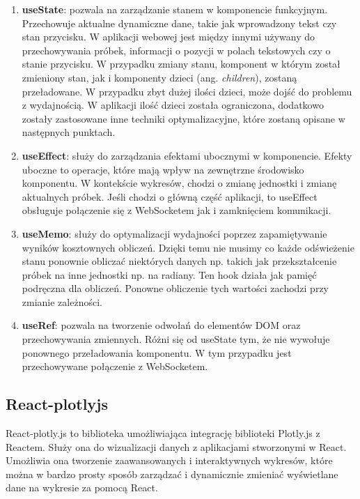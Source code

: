 \begin{enumerate}
    \item \textbf{useState}: pozwala na zarządzanie stanem w komponencie funkcyjnym. Przechowuje aktualne dynamiczne dane, takie jak wprowadzony tekst czy stan przycisku. W aplikacji webowej jest między innymi używany do przechowywania próbek, informacji o pozycji w polach tekstowych czy o stanie przycisku. W przypadku zmiany stanu, komponent w którym został zmieniony stan, jak i komponenty dzieci (ang. \textit{children}), zostaną przeładowane. W przypadku zbyt dużej ilości dzieci, może dojść do problemu z wydajnością. W aplikacji ilość dzieci została ograniczona, dodatkowo zostały zastosowane inne techniki optymalizacyjne, które zostaną opisane w następnych punktach.
    
    \item \textbf{useEffect}: służy do zarządzania efektami ubocznymi w komponencie. Efekty uboczne to operacje, które mają wpływ na zewnętrzne środowisko komponentu. W kontekście wykresów, chodzi o zmianę jednostki i zmianę aktualnych próbek. Jeśli chodzi o główną część aplikacji, to useEffect obsługuje połączenie się z WebSocketem jak i zamknięciem komunikacji.
    
    \item \textbf{useMemo}: służy do optymalizacji wydajności poprzez zapamiętywanie wyników kosztownych obliczeń. Dzięki temu nie musimy co każde odświeżenie stanu ponownie obliczać niektórych danych np. takich jak przekształcenie próbek na inne jednostki np. na radiany. Ten hook działa jak pamięć podręczna dla obliczeń. Ponowne obliczenie tych wartości zachodzi przy zmianie zależności.
    
    \item \textbf{useRef}: pozwala na tworzenie odwołań do elementów DOM oraz przechowywania zmiennych. Różni się od useState tym, że nie wywołuje ponownego przeładowania komponentu. W tym przypadku jest przechowywane połączenie z WebSocketem.
\end{enumerate}
\subsection{React-plotlyjs}
React-plotly.js to biblioteka umożliwiająca integrację biblioteki Plotly.js z Reactem. Służy ona do wizualizacji danych z aplikacjami stworzonymi w React. Umożliwia ona tworzenie zaawansowanych i interaktywnych wykresów, które można w bardzo prosty sposób zarządzać i dynamicznie zmieniać wyświetlane dane na wykresie za pomocą React.
